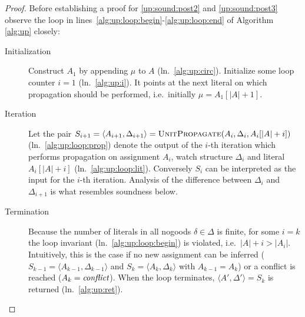\documentclass{vutinfth} %
\newcommand{\ass}{A}
\newcommand{\dpm}{\Delta^\pm}
\newcommand{\sgl}{\mu}
\begin{document}
\begin{proof}



Before establishing a proof for \ref{up:sound:post2} and \ref{up:sound:post3} observe the loop in lines~\ref{alg:up:loop:begin}-\ref{alg:up:loop:end} of Algorithm \ref{alg:up} closely:

\begin{description}
\item[Initialization] Construct $A_1$ by appending $\sgl$ to $\ass$ (ln.~\ref{alg:up:circ}). Initialize some loop counter $i = 1$ (ln.~\ref{alg:up:i}). It points at the next literal on which propagation should be performed, i.e.~initially $\sgl = \ass_1[|\ass| + 1]$. 

\item[Iteration] Let the pair $S_{i+1} = \langle \ass_{i+1}, \Delta_{i+1} \rangle = \textsc{UnitPropagate}(\ass_i, \Delta_i, \ass_i[|A| + i])$ (ln.~\ref{alg:up:loop:prop}) denote the output of the $i$-th iteration which performs propagation on assignment $\ass_i$, watch structure $\Delta_i$ and literal $\ass_i[|A| + i]$ (ln.~\ref{alg:up:loop:lit}). Conversely $S_i$ can be interpreted as the input for the $i$-th iteration. Analysis of the difference between $\Delta_{i}$ and $\Delta_{i+1}$ is what resembles soundness below.

\item[Termination] Because the number of literals in all nogoods $\delta \in \Delta$ is finite, for some $i = k$ the loop invariant (ln.~\ref{alg:up:loop:begin}) is violated, i.e.~$|A| + i > |\ass_{i}|$. Intuitively, this is the case if no new assignment can be inferred ($S_{k-1} = \langle \ass_{k-1}, \Delta_{k-1} \rangle$ and $S_k = \langle \ass_k, \Delta_k \rangle$ with $\ass_{k-1} = \ass_k$) or a conflict is reached ($\ass_k = \emph{conflict}$). When the loop terminates, $\langle \ass', \Delta' \rangle = S_k$ is returned (ln.~\ref{alg:up:ret}).
\end{description}


\end{proof}
\end{document}
